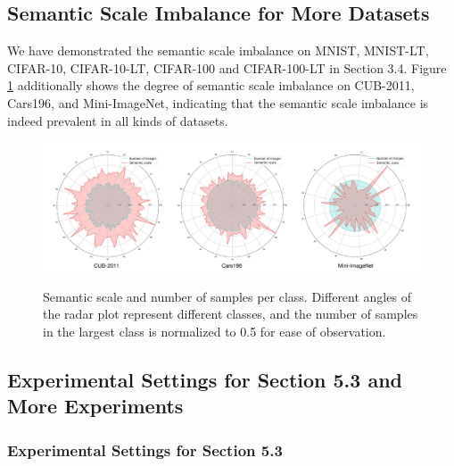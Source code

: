 \documentclass[10pt]{article} %
\begin{document}
\subsection{Semantic Scale Imbalance for More Datasets\label{B.4}}


We have demonstrated the semantic scale imbalance on MNIST, MNIST-LT, CIFAR-10, CIFAR-10-LT, CIFAR-100 and CIFAR-100-LT in Section 3.4. Figure \ref{fig5} additionally shows the degree of semantic scale imbalance on CUB-2011, Cars196, and Mini-ImageNet, indicating that the semantic scale imbalance is indeed prevalent in all kinds of datasets.



\begin{figure}[h] %
\begin{center}
\vskip -0.02in
\includegraphics[width=1\columnwidth]{figure5}
\vskip -0.05in
\caption{Semantic scale and number of samples per class. Different angles of the radar plot represent different classes, and the number of samples in the largest class is normalized to 0.5 for ease of observation.}
\vskip -0.03in
\label{fig5}
\end{center}
\end{figure}




\subsection{Experimental Settings for Section 5.3 and More Experiments\label{B.5}}


\subsubsection{Experimental Settings for Section 5.3\label{B.5.1}}
\end{document}
